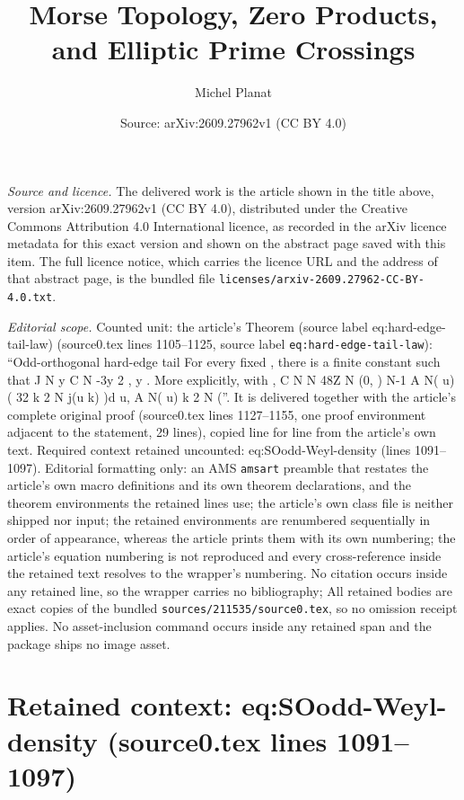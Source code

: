 \documentclass[10pt,a4paper]{amsart}
\title[Morse Topology, Zero Products, and Elliptic Prime Crossings]{Morse Topology, Zero Products, and Elliptic Prime Crossings}
\author{Michel Planat}
\date{Source: arXiv:2609.27962v1 (CC BY 4.0)}
\theoremstyle{plain}
\theoremstyle{remark}
\begin{document}
\maketitle

\noindent\emph{Source and licence.} The delivered work is the article shown in the title above, version arXiv:2609.27962v1 (CC BY 4.0), distributed under the Creative Commons Attribution 4.0 International licence, as recorded in the arXiv licence metadata for this exact version and shown on the abstract page saved with this item. The full licence notice, which carries the licence URL and the address of that abstract page, is the bundled file \texttt{licenses/arxiv-2609.27962-CC-BY-4.0.txt}.
\par\smallskip

\noindent\textit{Editorial scope.} Counted unit: the article's Theorem (source label eq:hard-edge-tail-law) (source0.tex lines 1105--1125, source label \texttt{eq:hard-edge-tail-law}): ``Odd-orthogonal hard-edge tail For every fixed , there is a finite constant such that J N y C N -3y 2 , y . More explicitly, with , C N N 48Z N (0, ) N-1 A N( u) ( 32 k 2 N j(u k) )d u, A N( u) k 2 N (''. It is delivered together with the article's complete original proof (source0.tex lines 1127--1155, one proof environment adjacent to the statement, 29 lines), copied line for line from the article's own text. Required context retained uncounted: eq:SOodd-Weyl-density (lines 1091--1097). Editorial formatting only: an AMS \texttt{amsart} preamble that restates the article's own macro definitions and its own theorem declarations, and the theorem environments the retained lines use; the article's own class file is neither shipped nor input; the retained environments are renumbered sequentially in order of appearance, whereas the article prints them with its own numbering; the article's equation numbering is not reproduced and every cross-reference inside the retained text resolves to the wrapper's numbering. No citation occurs inside any retained line, so the wrapper carries no bibliography; All retained bodies are exact copies of the bundled \texttt{sources/211535/source0.tex}, so no omission receipt applies. No asset-inclusion command occurs inside any retained span and the package ships no image asset.


\section*{Retained context: eq:SOodd-Weyl-density (source0.tex lines 1091--1097)}
\end{document}
